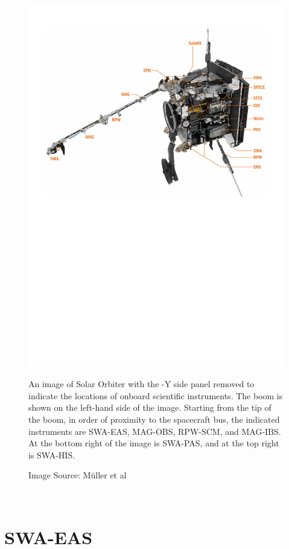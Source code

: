 \begin{figure}[h]
    \centering
    \includegraphics[width=1\linewidth]{figures/instruments.pdf}
    \caption{An image of Solar Orbiter with the -Y side panel removed to indicate the locations of onboard scientific instruments\cite{muller2020}. The boom is shown on the left-hand side of the image. Starting from the tip of the boom, in order of proximity to the spacecraft bus, the indicated instruments are SWA-EAS, MAG-OBS, RPW-SCM, and MAG-IBS\cite{horbury2020}\cite{maksimovic2020}. At the bottom right of the image is SWA-PAS, and at the top right is SWA-HIS\cite{owen2020}. }
    \caption*{Image Source: Müller et al\cite{muller2020}}
    \label{fig: instruments}
\end{figure}
\\

\section{SWA-EAS}

